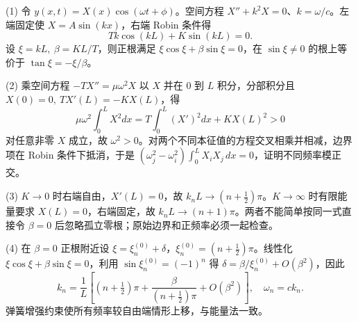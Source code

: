 (1) 令 \(y(x,t)=X(x)\cos(\omega t+\phi)\)。空间方程 \(X''+k^2X=0\)、\(k=\omega/c\)。左端固定使 \(X=A\sin(kx)\)，右端 Robin 条件得
\[
Tk\cos(kL)+K\sin(kL)=0.
\]
设 \(\xi=kL,\ \beta=KL/T\)，则正根满足 \(\xi\cos\xi+\beta\sin\xi=0\)，在 \(\sin\xi\ne0\) 的根上等价于 \(\tan\xi=-\xi/\beta\)。

(2) 乘空间方程 \(-TX''=\mu\omega^2X\) 以 \(X\) 并在 \(0\) 到 \(L\) 积分，分部积分且 \(X(0)=0,\ TX'(L)=-KX(L)\)，得
\[
\mu\omega^2\int_0^L X^2dx=T\int_0^L(X')^2dx+KX(L)^2>0
\]
对任意非零 \(X\) 成立，故 \(\omega^2>0\)。对两个不同本征值的方程交叉相乘并相减，边界项在 Robin 条件下抵消，于是 \((\omega_j^2-\omega_i^2)\int_0^L X_iX_j\,dx=0\)，证明不同频率模正交。

(3) \(K\to0\) 时右端自由，\(X'(L)=0\)，故 \(k_nL\to(n+\tfrac12)\pi\)。\(K\to\infty\) 时有限能量要求 \(X(L)=0\)，右端固定，故 \(k_nL\to(n+1)\pi\)。两者不能简单按同一式直接令 \(\beta=0\) 后忽略孤立零根；原始边界和正频率必须一起检查。

(4) 在 \(\beta=0\) 正根附近设 \(\xi=\xi_n^{(0)}+\delta\)，\(\xi_n^{(0)}=(n+\tfrac12)\pi\)。线性化 \(\xi\cos\xi+\beta\sin\xi=0\)，利用 \(\sin\xi_n^{(0)}=(-1)^n\) 得 \(\delta=\beta/\xi_n^{(0)}+O(\beta^2)\)，因此
\[
k_n=\frac1L\left[(n+\tfrac12)\pi+\frac{\beta}{(n+\tfrac12)\pi}+O(\beta^2)\right],\quad \omega_n=ck_n.
\]
弹簧增强约束使所有频率较自由端情形上移，与能量法一致。
